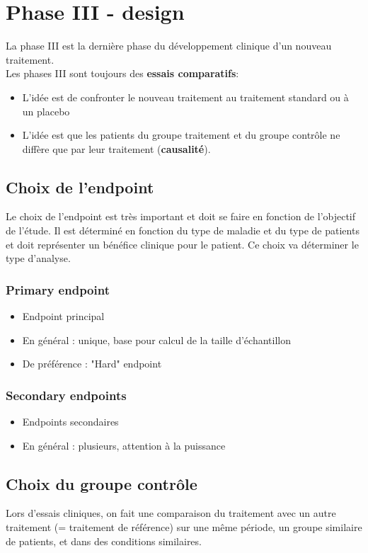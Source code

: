 \chapter{Phase III - design}

La phase III est la dernière phase du développement clinique d’un nouveau traitement.\\

Les phases III sont toujours des \textbf{essais comparatifs}:
\begin{itemize}
    \item L’idée est de confronter le nouveau traitement au traitement
standard ou à un placebo
    \item L’idée est que les patients du groupe traitement et du groupe
contrôle ne diffère que par leur traitement (\textbf{causalité}).
\end{itemize}

\section{Choix de l’endpoint}

Le choix de l’endpoint est très important et doit se faire en fonction de l’objectif de l’étude. Il est déterminé en fonction du type de maladie et du type de
patients et doit représenter un bénéfice clinique pour le patient. Ce choix va déterminer le type d’analyse. 

\subsection{Primary endpoint}
\begin{itemize}
    \item Endpoint principal
    \item En général : unique, base pour calcul de la taille d’échantillon
    \item De préférence : "Hard" endpoint
\end{itemize}

\subsection{Secondary endpoints}
\begin{itemize}
    \item Endpoints secondaires
     \item En général : plusieurs, attention à la puissance
\end{itemize}


\section{Choix du groupe contrôle}
Lors d'essais cliniques, on fait une comparaison du traitement avec un autre traitement (= traitement de référence) sur une même période, un groupe similaire de patients, et dans des conditions similaires.\\

